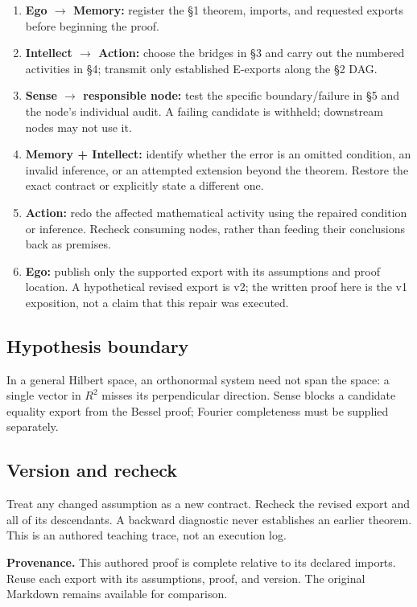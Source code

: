 \documentclass[preprint,12pt,aps,pra,showkeys,amsmath,amssymb,superscriptaddress,floatfix]{revtex4-2}
\theoremstyle{definition}
\theoremstyle{remark}
\providecommand{\tightlist}{\setlength{\itemsep}{2pt}\setlength{\parskip}{0pt}}
\begin{document}
\begin{enumerate}
\def\labelenumi{\arabic{enumi}.}
\tightlist
\item
  \textbf{Ego \(\to\) Memory:} register the §1 theorem, imports, and
  requested exports before beginning the proof.
\item
  \textbf{Intellect \(\to\) Action:} choose the bridges in §3 and carry
  out the numbered activities in §4; transmit only established E-exports
  along the §2 DAG.
\item
  \textbf{Sense \(\to\) responsible node:} test the specific
  boundary/failure in §5 and the node's individual audit. A failing
  candidate is withheld; downstream nodes may not use it.
\item
  \textbf{Memory + Intellect:} identify whether the error is an omitted
  condition, an invalid inference, or an attempted extension beyond the
  theorem. Restore the exact contract or explicitly state a different
  one.
\item
  \textbf{Action:} redo the affected mathematical activity using the
  repaired condition or inference. Recheck consuming nodes, rather than
  feeding their conclusions back as premises.
\item
  \textbf{Ego:} publish only the supported export with its assumptions
  and proof location. A hypothetical revised export is v2; the written
  proof here is the v1 exposition, not a claim that this repair was
  executed.
\end{enumerate}

\subsection{Hypothesis boundary}
In a general Hilbert space, an orthonormal system need not span the
space: a single vector in \(R^{2}\) misses its perpendicular direction.
Sense blocks a candidate equality export from the Bessel proof; Fourier
completeness must be supplied separately.

\subsection{Version and recheck}
Treat any changed assumption as a new contract. Recheck the revised
export and all of its descendants. A backward diagnostic never
establishes an earlier theorem. This is an authored teaching trace, not
an execution log.

\par\medskip\begingroup\small\linespread{1.0}\selectfont\noindent\textbf{Provenance.} This authored proof is complete relative to its declared imports. Reuse
each export with its assumptions, proof, and version. The original
Markdown remains available for comparison.
\par\endgroup
\end{document}
